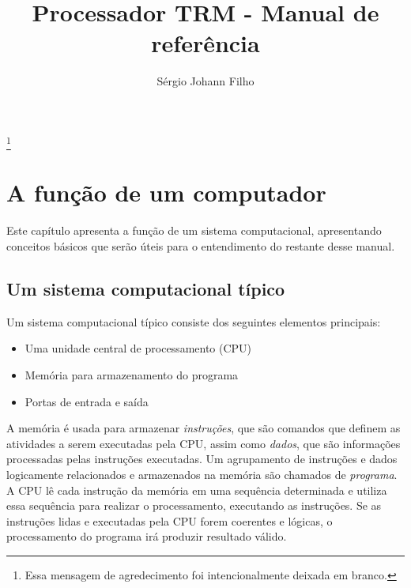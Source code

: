 \documentclass[11pt,a4paper]{report}
\begin{document}
\pagestyle{empty}
\title{\textbf{Processador TRM - Manual de referência}}
\author{Sérgio Johann Filho}

\maketitle

\thispagestyle{empty}
\thanks{Essa mensagem de agredecimento foi intencionalmente deixada em branco.}
\newpage

\tableofcontents

\pagestyle{fancy}
\fancyhf{}
\lhead[]{\thepage}
\rhead[\thepage]{}

\newpage
\thispagestyle{empty}

\chapter{A função de um computador}

Este capítulo apresenta a função de um sistema computacional, apresentando
conceitos básicos que serão úteis para o entendimento do restante desse manual.

\section{Um sistema computacional típico}

Um sistema computacional típico consiste dos seguintes elementos principais:

\begin{itemize}
\item Uma unidade central de processamento (CPU)
\item Memória para armazenamento do programa
\item Portas de entrada e saída
\end{itemize}

A memória é usada para armazenar \textit{instruções}, que são comandos
que definem as atividades a serem executadas pela CPU, assim como
\textit{dados}, que são informações processadas pelas instruções
executadas. Um agrupamento de instruções e dados logicamente
relacionados e armazenados na memória são chamados de \textit{programa}.
A CPU lê cada instrução da memória em uma sequência determinada e utiliza
essa sequência para realizar o processamento, executando as instruções.
Se as instruções lidas e executadas pela CPU forem coerentes e lógicas,
o processamento do programa irá produzir resultado válido.
\end{document}
